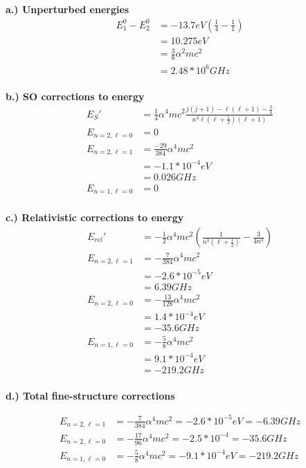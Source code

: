 \documentclass[10pt]{article} %
\begin{document}
\textbf{a.) Unperturbed energies}
\begin{align*}
  E_1^0 - E_2^0 &= -13.7eV\left(\frac{1}{4} - \frac{1}{1}\right)\\
  &= 10.275eV\\
  &= \frac{3}{8}\alpha^2mc^2\\
  &= 2.48 * 10^6 GHz\\
\end{align*}

\textbf{b.) SO corrections to energy}
\begin{align*}
  E_{S}' &= \frac{1}{4}\alpha^4mc^2\frac{j(j+1)
    - \ell(\ell+1) - \frac{3}{4}}{n^3\ell(\ell+\frac{1}{2})(\ell+1)}\\
  E_{n=2,\ell=0} &= 0\\
  E_{n=2,\ell=1} &= \frac{-29}{384}\alpha^4mc^2\\
  &= -1.1 *10^{-4} eV\\
  &= 0.026 GHz\\
  E_{n=1,\ell=0} &= 0\\
\end{align*}

\textbf{c.) Relativistic corrections to energy}
\begin{align*}
  E_{rel}' &= -\frac{1}{2}\alpha^4mc^2
  \left(\frac{1}{n^3(\ell+\frac{1}{2})} - \frac{3}{4n^4}\right)\\
  E_{n=2,\ell=1} &= -\frac{7}{384}\alpha^4mc^2\\
  &= -2.6*10^{-5} eV\\
  &= 6.39 GHz\\
  E_{n=2,\ell=0} &= -\frac{13}{128}\alpha^4mc^2\\
  &= 1.4*10^{-4} eV\\
  &= -35.6 GHz\\
  E_{n=1,\ell=0} &= -\frac{5}{8}\alpha^4mc^2\\
  &= 9.1*10^{-4} eV\\
  &= -219.2 GHz\\
\end{align*}

\textbf{d.) Total fine-structure corrections}

\begin{align*}
  E_{n=2,\ell=1} &= -\frac{7}{384}\alpha^4mc^2 = -2.6*10^{-5} eV = -6.39 GHz\\
  E_{n=2,\ell=0} &= -\frac{17}{96}\alpha^4mc^2 = -2.5*10^{-4} = -35.6 GHz\\
  E_{n=1,\ell=0} &= -\frac{5}{8}\alpha^4mc^2 = -9.1*10^{-4} eV = -219.2 GHz\\
\end{align*}
\end{document}
